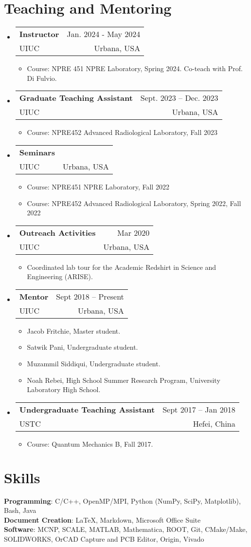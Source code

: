 \documentclass[letterpaper,11pt]{article} %
\makeatletter
\newcommand{\CVItem}[1]{
  \item\small{
    {#1 \vspace{-2pt}}
  }
}
\newcommand{\CVSubheading}[4]{
  \vspace{-2pt}\item
    \begin{tabular*}{0.97\textwidth}[t]{l@{\extracolsep{\fill}}r}
      \textbf{#1} & #2 \\
      \small#3 & \small #4 \\
    \end{tabular*}\vspace{-7pt}
}
\newcommand{\CVSubHeadingListStart}{\begin{itemize}[leftmargin=0.5cm, label={}]}
\newcommand{\CVSubHeadingListEnd}{\end{itemize}}
\newcommand{\CVItemListStart}{\begin{itemize}}
\newcommand{\CVItemListEnd}{\end{itemize}\vspace{-5pt}}
\makeatother
\begin{document}
\section{Teaching and Mentoring}
\CVSubHeadingListStart
    \CVSubheading
    {Instructor}{Jan. 2024 - May 2024}
    {UIUC}{Urbana, USA}
    \CVItemListStart
      \CVItem{Course: NPRE 451 NPRE Laboratory, Spring 2024. Co-teach with Prof. Di Fulvio.}
    \CVItemListEnd
    \CVSubheading
      {Graduate Teaching Assistant}{Sept. 2023 – Dec. 2023}
      {UIUC}{Urbana, USA}
      \CVItemListStart
        \CVItem{Course: NPRE452 Advanced Radiological Laboratory, Fall 2023}
      \CVItemListEnd
    \CVSubheading
      {Seminars}{}
      {UIUC}{Urbana, USA}
      \CVItemListStart
        \CVItem{Course: NPRE451 NPRE Laboratory, Fall 2022}
        \CVItem{Course: NPRE452 Advanced Radiological Laboratory, Spring 2022, Fall 2022}
      \CVItemListEnd
    \CVSubheading
      {Outreach Activities}{Mar 2020}
      {UIUC}{Urbana, USA}
      \CVItemListStart
        \CVItem{Coordinated lab tour for the Academic Redshirt in Science and Engineering (ARISE).}
      \CVItemListEnd
    \CVSubheading
      {Mentor}{Sept 2018 – Present}
      {UIUC}{Urbana, USA}
      \CVItemListStart
        \CVItem{Jacob Fritchie, Master student.}
        \CVItem{Satwik Pani, Undergraduate student.}
        \CVItem{Muzammil Siddiqui, Undergraduate student.}
        \CVItem{Noah Rebei, High School Summer Research Program, University Laboratory High School.}
      \CVItemListEnd
    \CVSubheading
      {Undergraduate Teaching Assistant}{Sept 2017 – Jan 2018}
      {USTC}{Hefei, China}
      \CVItemListStart
        \CVItem{Course: Quantum Mechanics B, Fall 2017.}
      \CVItemListEnd
  \CVSubHeadingListEnd

\begin{comment}
This section is compressed from the various skills sections that Euro CV
recommends.
\end{comment}

\section{Skills}
 \begin{itemize}[leftmargin=0.5cm, label={}]
    {\item{
     \textbf{Programming}{: C/C++, OpenMP/MPI, Python (NumPy, SciPy, Matplotlib), Bash, Java} \\
     \textbf{Document Creation}{: \LaTeX, Markdown, Microsoft Office Suite} \\
     \textbf{Software}{: MCNP, SCALE, MATLAB, Mathematica, ROOT, Git, CMake/Make, SOLIDWORKS, OrCAD Capture and PCB Editor, Origin, Vivado}\\
    }}
 \end{itemize}
\end{document}
